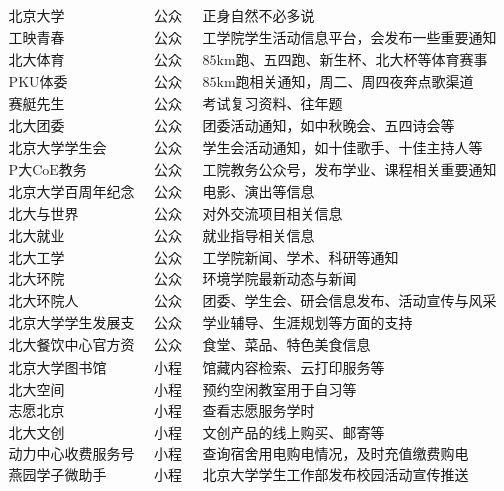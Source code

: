 \[
\begin{matrix}
	\text{北京大学} & \text{公众号} & \text{正身自然不必多说}\\
	\text{工映青春} & \text{公众号} & \text{工学院学生活动信息平台，会发布一些重要通知}\\
	\text{北大体育} & \text{公众号} & \text{85km跑、五四跑、新生杯、北大杯等体育赛事通知}\\
	\text{PKU体委} & \text{公众号} & \text{85km跑相关通知，周二、周四夜奔点歌渠道}\\
	\text{赛艇先生} & \text{公众号} & \text{考试复习资料、往年题}\\
	\text{北大团委} & \text{公众号} & \text{团委活动通知，如中秋晚会、五四诗会等}\\
	\text{北京大学学生会} & \text{公众号} & \text{学生会活动通知，如十佳歌手、十佳主持人等}\\
	\text{P大CoE教务} & \text{公众号} & \text{工院教务公众号，发布学业、课程相关重要通知}\\
	\text{北京大学百周年纪念讲堂} & \text{公众号} & \text{电影、演出等信息}\\
	\text{北大与世界} & \text{公众号} & \text{对外交流项目相关信息}\\
	\text{北大就业} & \text{公众号} & \text{就业指导相关信息}\\
	\text{北大工学} & \text{公众号} & \text{工学院新闻、学术、科研等通知}\\
	\text{北大环院} & \text{公众号} & \text{环境学院最新动态与新闻}\\
	\text{北大环院人} & \text{公众号} & \text{团委、学生会、研会信息发布、活动宣传与风采展示平台}\\
	\text{北京大学学生发展支持} & \text{公众号} & \text{学业辅导、生涯规划等方面的支持}\\
	\text{北大餐饮中心官方资讯} & \text{公众号} & \text{食堂、菜品、特色美食信息}\\
	\text{北京大学图书馆} & \text{小程序} & \text{馆藏内容检索、云打印服务等}\\
	\text{北大空间} & \text{小程序} & \text{预约空闲教室用于自习等}\\
	\text{志愿北京} & \text{小程序} & \text{查看志愿服务学时}\\
	\text{北大文创} & \text{小程序} & \text{文创产品的线上购买、邮寄等}\\
	\text{动力中心收费服务号} & \text{小程序} & \text{查询宿舍用电购电情况，及时充值缴费购电}\\
	\text{燕园学子微助手} & \text{小程序} & \text{北京大学学生工作部发布校园活动宣传推送}\\
\end{matrix}
\]

